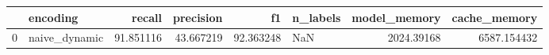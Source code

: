 \begin{tabular}{llrrrlrr}
\toprule
{} &       encoding &     recall &  precision &         f1 & n\_labels &  model\_memory &  cache\_memory \\
\midrule
0 &  naive\_dynamic &  91.851116 &  43.667219 &  92.363248 &      NaN &    2024.39168 &   6587.154432 \\
\bottomrule
\end{tabular}
